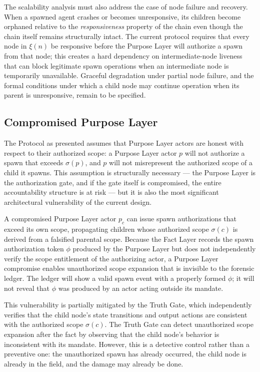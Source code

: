 The scalability analysis must also address the case of node failure and recovery. When a spawned agent crashes or becomes unresponsive, its children become orphaned relative to the \textit{responsiveness} property of the chain even though the chain itself remains structurally intact. The current protocol requires that every node in $\xi(n)$ be responsive before the Purpose Layer will authorize a spawn from that node; this creates a hard dependency on intermediate-node liveness that can block legitimate spawn operations when an intermediate node is temporarily unavailable. Graceful degradation under partial node failure, and the formal conditions under which a child node may continue operation when its parent is unresponsive, remain to be specified.

\subsection{Compromised Purpose Layer}

The Protocol as presented assumes that Purpose Layer actors are honest with respect to their authorized scope: a Purpose Layer actor $p$ will not authorize a spawn that exceeds $\sigma(p)$, and $p$ will not misrepresent the authorized scope of a child it spawns. This assumption is structurally necessary --- the Purpose Layer is the authorization gate, and if the gate itself is compromised, the entire accountability structure is at risk --- but it is also the most significant architectural vulnerability of the current design.

A compromised Purpose Layer actor $p_c$ can issue spawn authorizations that exceed its own scope, propagating children whose authorized scope $\sigma(c)$ is derived from a falsified parental scope. Because the Fact Layer records the spawn authorization token $\phi$ produced by the Purpose Layer but does not independently verify the scope entitlement of the authorizing actor, a Purpose Layer compromise enables unauthorized scope expansion that is invisible to the forensic ledger. The ledger will show a valid spawn event with a properly formed $\phi$; it will not reveal that $\phi$ was produced by an actor acting outside its mandate.

This vulnerability is partially mitigated by the Truth Gate, which independently verifies that the child node's state transitions and output actions are consistent with the authorized scope $\sigma(c)$. The Truth Gate can detect unauthorized scope expansion after the fact by observing that the child node's behavior is inconsistent with its mandate. However, this is a detective control rather than a preventive one: the unauthorized spawn has already occurred, the child node is already in the field, and the damage may already be done.

